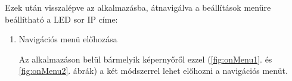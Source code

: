 \documentclass[../main.tex]{subfiles}
\begin{document}
        \vspace{1cm}
            Ezek után visszalépve az alkalmazásba, átnavigálva a beállítások menüre beállítható a LED sor IP címe:
            
            \begin{enumerate}
                \item Navigációs menü előhozása
                
                    Az alkalmazáson belül bármelyik képernyőről ezzel (\ref{fig:onMenu1}. és \ref{fig:onMenu2}. ábrák) a két módszerrel lehet előhozni a navigációs menüt.
                    \begin{figure}[h!]
                        \begin{floatrow}
                        \end{floatrow}
                    \end{figure}
                    

\end{enumerate}
\end{document}
